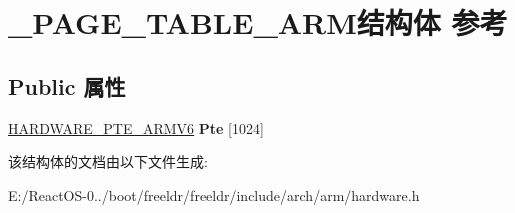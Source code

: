 \hypertarget{struct___p_a_g_e___t_a_b_l_e___a_r_m}{}\section{\+\_\+\+P\+A\+G\+E\+\_\+\+T\+A\+B\+L\+E\+\_\+\+A\+R\+M结构体 参考}
\label{struct___p_a_g_e___t_a_b_l_e___a_r_m}
\subsection*{Public 属性}
\begin{DoxyCompactItemize}
\item 
\mbox{\label{struct___p_a_g_e___t_a_b_l_e___a_r_m_a3d1ca1d6b8512d4accc6126309f9135a}} 
\hyperlink{struct___h_a_r_d_w_a_r_e___p_t_e___a_r_m_v6}{H\+A\+R\+D\+W\+A\+R\+E\+\_\+\+P\+T\+E\+\_\+\+A\+R\+M\+V6} {\bfseries Pte} \mbox{[}1024\mbox{]}
\end{DoxyCompactItemize}


该结构体的文档由以下文件生成\+:\begin{DoxyCompactItemize}
\item 
E\+:/\+React\+O\+S-\/0../boot/freeldr/freeldr/include/arch/arm/hardware.\+h\end{DoxyCompactItemize}
